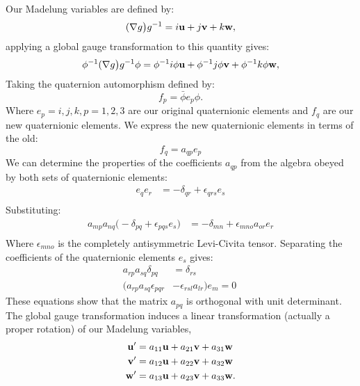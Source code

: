 \documentclass[a4paper,aps,prd,preprint,groupedaddress]{revtex4}
\newcommand{\bfu}{{\bf u}}
\newcommand{\bfv}{{\bf v}}
\newcommand{\bfw}{{\bf w}}
\begin{document}
Our Madelung variables are defined by:
\begin{equation}
(\nabla g\bigr)g^{-1} = i\bfu +j\bfv +k\bfw,
\end{equation}
applying a global gauge transformation to this quantity gives:
\begin{equation}
\phi^{-1}(\nabla g\bigr)g^{-1} \phi= \phi^{-1}i\phi\bfu +\phi^{-1}j\phi\bfv +\phi^{-1}k\phi\bfw,
\end{equation}
Taking the quaternion automorphism defined by:
\begin{equation}
f_p = \bar \phi e_p\phi.
\end{equation}
Where $e_p = i,j,k, p=1,2,3$ are our original quaternionic elements and $f_q$ are our new quaternionic elements. We express the new quaternionic elements in terms of the old:
\begin{equation}
f_q=a_{qp} e_p
\end{equation}
We can determine the properties of the coefficients $a_{qp}$ from the algebra obeyed by both sets of quaternionic elements:
\begin{equation}
\begin{split}
e_qe_r &= -\delta_{qr} + \epsilon_{qrs}e_s\\
\end{split}
\end{equation}
Substituting:
\begin{equation}
\begin{split}
a_{mp}a_{nq}\biggl(-\delta_{pq} +\epsilon_{pqs}e_s\biggr) &= -\delta_{mn} +\epsilon_{mno}a_{or}e_r\\
\end{split}
\end{equation}
Where $\epsilon_{mno}$ is the completely antisymmetric Levi-Civita tensor. Separating the coefficients of the quaternionic elements $e_s$ gives:
\begin{equation}
\begin{split}
a_{rp}a_{sq} \delta_{pq}&= \delta_{rs}\\
\bigl(a_{rp}a_{sq} \epsilon_{pqr} &-\epsilon_{rsl}a_{lr}\bigr)e_m=0\
\end{split}
\end{equation}
These equations show that the matrix $a_{pq}$ is orthogonal with unit determinant. The global gauge transformation induces a linear transformation (actually a proper rotation) of our Madelung variables,
\begin{equation}
\begin{split}
\bfu'& = a_{11}\bfu + a_{21}\bfv + a_{31}\bfw\\
\bfv'& = a_{12}\bfu + a_{22}\bfv + a_{32}\bfw\\
\bfw'& = a_{13}\bfu + a_{23}\bfv + a_{33}\bfw.
\end{split}
\end{equation} 
\end{document}
